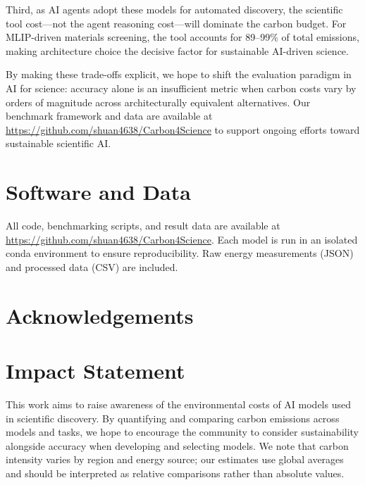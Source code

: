 \documentclass{article}
\theoremstyle{plain}
\theoremstyle{definition}
\theoremstyle{remark}
\begin{document}
Third, as AI agents adopt these models for automated discovery, the scientific tool cost---not the agent reasoning cost---will dominate the carbon budget. For MLIP-driven materials screening, the tool accounts for 89--99\% of total emissions, making architecture choice the decisive factor for sustainable AI-driven science.

By making these trade-offs explicit, we hope to shift the evaluation paradigm in AI for science: accuracy alone is an insufficient metric when carbon costs vary by orders of magnitude across architecturally equivalent alternatives. Our benchmark framework and data are available at \url{https://github.com/shuan4638/Carbon4Science} to support ongoing efforts toward sustainable scientific AI.


\section*{Software and Data}

All code, benchmarking scripts, and result data are available at \url{https://github.com/shuan4638/Carbon4Science}. Each model is run in an isolated conda environment to ensure reproducibility. Raw energy measurements (JSON) and processed data (CSV) are included.

\section*{Acknowledgements}


\section*{Impact Statement}

This work aims to raise awareness of the environmental costs of AI models used in scientific discovery. By quantifying and comparing carbon emissions across models and tasks, we hope to encourage the community to consider sustainability alongside accuracy when developing and selecting models. We note that carbon intensity varies by region and energy source; our estimates use global averages and should be interpreted as relative comparisons rather than absolute values.

\nocite{langley00}
\end{document}
